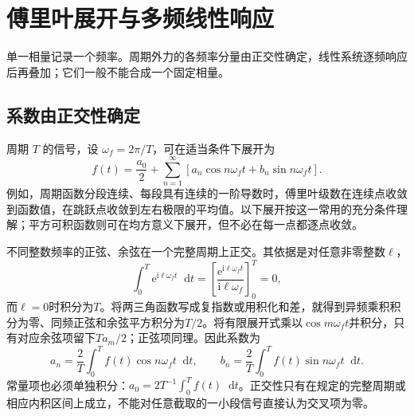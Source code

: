 \documentclass[11pt,openany,fontset=fandol]{ctexbook}
\theoremstyle{plain}\newtheorem{theorem}{定理}[chapter]\newtheorem{proposition}[theorem]{命题}
\theoremstyle{definition}\newtheorem{definition}{定义}[chapter]\newtheorem{example}{例}[chapter]
\theoremstyle{remark}\newtheorem*{remark}{说明}
\newcommand{\dd}{\mathop{}\!\mathrm d}\newcommand{\ii}{\mathrm i}\newcommand{\ee}{\mathrm e}
\begin{document}
\section{傅里叶展开与多频线性响应}
单一相量记录一个频率。周期外力的各频率分量由正交性确定，线性系统逐频响应后再叠加；它们一般不能合成一个固定相量。

\subsection{系数由正交性确定}
周期 $T$ 的信号，设 $\omega_f=2\pi/T$，可在适当条件下展开为
\[
f(t)=\frac{a_0}{2}+\sum_{n=1}^{\infty}[a_n\cos n\omega_ft+b_n\sin n\omega_ft].
\]
例如，周期函数分段连续、每段具有连续的一阶导数时，傅里叶级数在连续点收敛到函数值，在跳跃点收敛到左右极限的平均值。以下展开按这一常用的充分条件理解；平方可积函数则可在均方意义下展开，但不必在每一点都逐点收敛。

不同整数频率的正弦、余弦在一个完整周期上正交。其依据是对任意非零整数$\ell$，
\[\int_0^T\ee^{\ii\ell\omega_ft}\dd t
=\left[\frac{\ee^{\ii\ell\omega_ft}}{\ii\ell\omega_f}\right]_0^T=0,\]
而$\ell=0$时积分为$T$。将两三角函数写成复指数或用积化和差，就得到异频乘积积分为零、同频正弦和余弦平方积分为$T/2$。将有限展开式乘以$\cos m\omega_ft$并积分，只有对应余弦项留下$Ta_m/2$；正弦项同理。因此系数为
\[
a_n=\frac2T\int_0^Tf(t)\cos n\omega_ft\dd t,\qquad b_n=\frac2T\int_0^Tf(t)\sin n\omega_ft\dd t.
\]
常量项也必须单独积分：$a_0=2T^{-1}\int_0^Tf(t)\dd t$。正交性只有在规定的完整周期或相应内积区间上成立，不能对任意截取的一小段信号直接认为交叉项为零。
\end{document}
